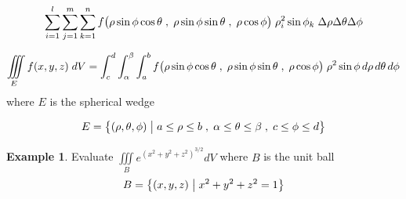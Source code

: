 \documentclass[11pt,a4paper]{article}
\theoremstyle{definition}
\newtheorem{exa}[thm]{Example}
\begin{document}
$$\sum^l_{i=1}\sum^m_{j=1}\sum^n_{k=1} f\big(\rho \sin \phi \cos \theta\hspace{0.1cm},\hspace{0.1cm} \rho \sin \phi \sin \theta \hspace{0.1cm}, \hspace{0.1cm} \rho \cos \phi\big) \hspace{0.1cm}\rho^2_i\sin\phi_k\hspace{0.1cm}\Delta \rho \Delta \theta \Delta \phi$$


$$\iiint\limits_E f(x,y,z)\hspace{0.1cm}dV = \int^d_c\int^{\beta}_{\alpha} \int^b_a f\big(\rho \sin \phi \cos \theta\hspace{0.1cm},\hspace{0.1cm} \rho \sin \phi \sin \theta \hspace{0.1cm}, \hspace{0.1cm} \rho \cos \phi\big)\hspace{0.1cm}\rho^2\sin \phi\, d\rho\, d\theta\, d\phi$$ where $E$ is the spherical wedge

$$ E = \big\{ (\rho, \theta, \phi) \hspace{0.1cm} \big| \hspace{0.1cm} a\leq \rho \leq b\hspace{0.1cm} , \hspace{0.1cm} \alpha \leq \theta \leq \beta \hspace{0.1cm} , \hspace{0.1cm} c \leq \phi \leq d\big\}$$


\begin{exa}


Evaluate $\displaystyle{\iiint\limits_B e^{(x^2 + y^2 +z^2)^{3/2}}dV}$ where $B$ is the unit ball $$B = \big\{(x,y,z)\hspace{0.1cm}\big|\hspace{0.1cm} x^2 + y^2 + z^2 = 1\big\}$$
\end{exa}
\end{document}
